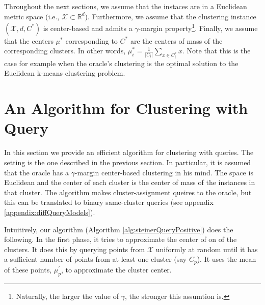 \documentclass[orivec]{llncs}
\newcommand{\mc}{\mathcal}
\begin{document}
Throughout the next sections, we assume that the instaces are in a Euclidean metric space (i.e., $\mc X\subset \mathbb{R}^d$). Furthermore, we assume that the clustering instance $(\mc X, d, C^*)$ is center-based and admits a $\gamma$-margin property\footnote{Naturally, the larger the value of $\gamma$, the stronger this assumtion is.}. Finally, we assume that the centers $\mu^*$ corresponding to $C^*$ are the centers of mass of the corresponding clusters. In other words, $\mu^*_i=\frac{1}{|C_i|}\sum_{x\in C^*_i} x$. Note that this is the case for example when the oracle's clustering is the optimal solution to the Euclidean k-means clustering problem.

\section{An Algorithm for Clustering with Query}
\label{section:clusteringWithQuery}

In this section we provide an efficient algorithm for clustering with queries. The setting is the one described in the previous section. In particular, it is assumed that the oracle has a $\gamma$-margin center-based clustering in his mind. The space is Euclidean and the center of each cluster is the center of mass of the instances in that cluster. The algorithm makes cluster-assignment queires to the oracle, but this can be translated to binary same-cluster queries (see appendix \ref{appendix:diffQueryModels}). 


Intuitively, our algorithm (Algorithm  \ref{alg:steinerQueryPositive}) does the following. In the first phase, it tries to approximate the center of on of the clusters. It does this by querying points from $\mc X$ uniformly at random until it has a sufficient number of points from at least one cluster (say $C_p$). It uses the mean of these points, $\mu_p^\prime$, to approximate the cluster center. 
\end{document}
